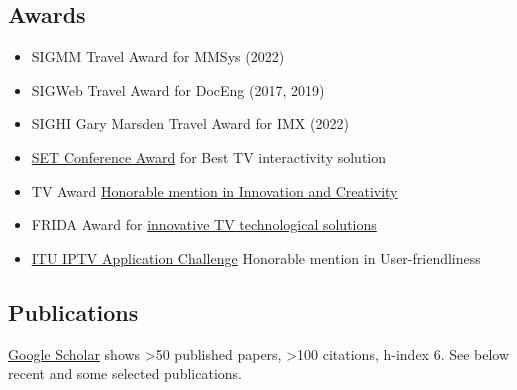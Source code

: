 \documentclass[10pt,a4paper,sans,colorlinks]{moderncv}
\begin{document}
\subsection{Awards}
  \begin{itemize}[mynosep]
    \item SIGMM Travel Award for MMSys (2022)
    \item SIGWeb Travel Award for DocEng (2017, 2019)
    \item SIGHI Gary Marsden Travel Award for IMX (2022)
  \end{itemize}
  \begin{itemize}[mynosep]
    \item \href{http://set.org.br/artigos/ed137/137_revistadaset_70.pdf}{SET Conference Award} for Best TV interactivity solution
    \item  TV Award \href{https://www.premiotv.com/es/ganadores-es/ganadores-2013-es}{Honorable mention in Innovation and Creativity}
    \item  FRIDA Award for \href{https://programafrida.net/archivos/project/brasil-4d}{innovative TV technological solutions}
  \end{itemize}
  \begin{itemize}[mynosep]
    \item \href{https://itu.int/en/ITU-T/challenges/pages/iptv.aspx}{ITU IPTV Application Challenge} Honorable mention in User-friendliness
  \end{itemize}

\subsection{Publications}

\href{https://scholar.google.com/citations?user=1bEOmkUAAAAJ&hl=en}{Google Scholar} shows >50 published papers, >100 citations, h-index 6. See below recent and some selected publications.  
\end{document}
